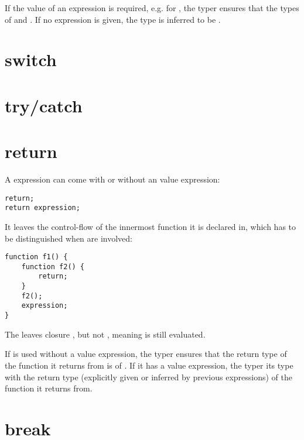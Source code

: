 \documentclass{haxe}
\begin{document}
If the value of an  expression is required, e.g. for , the typer ensures that the types of  and  . If no  expression is given, the type is inferred to be .


\section{switch}
\label{expression-switch}

\section{try/catch}
\label{expression-try-catch}

\section{return}
\label{expression-return}

A  expression can come with or without an value expression:

\begin{lstlisting}
return;
return expression;
\end{lstlisting}

It leaves the control-flow of the innermost function it is declared in, which has to be distinguished when  are involved:

\begin{lstlisting}
function f1() {
	function f2() {
		return;
	}
	f2();
	expression;
}
\end{lstlisting}

The  leaves closure , but not , meaning  is still evaluated.

If  is used without a value expression, the typer ensures that the return type of the function it returns from is of . If it has a value expression, the typer  its type with the return type (explicitly given or inferred by previous  expressions) of the function it returns from.


\section{break}
\label{expression-break}
\end{document}
